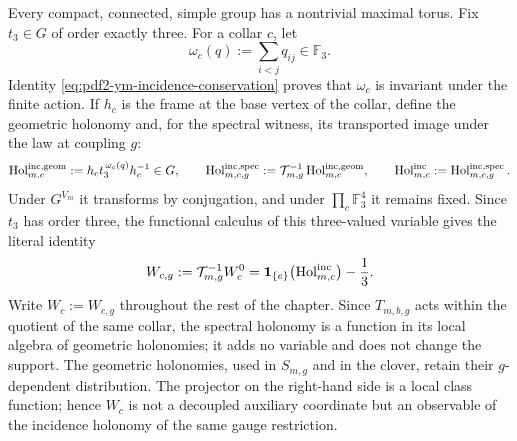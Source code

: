 Every compact, connected, simple group has a nontrivial maximal torus. Fix
$t_3\in G$ of order exactly three. For a collar $c$, let
\begin{equation}\label{eq:pdf2-ym-owner-incidence-flux}
 \omega_c(q):=\sum_{i<j}q_{ij}\in\mathbb F_3.
\end{equation}
Identity \eqref{eq:pdf2-ym-incidence-conservation} proves that $\omega_c$ is
invariant under the finite action. If $h_c$ is the frame at the base vertex of the collar,
define the geometric holonomy and, for the spectral witness, its transported image
under the law at coupling $g$:
\begin{equation}\label{eq:pdf2-ym-owner-incidence-holonomy}
 \operatorname{Hol}_{m,c}^{\rm inc,geom}:=h_ct_3^{\,\omega_c(q)}h_c^{-1}\in G,
 \qquad
 \operatorname{Hol}_{m,c,g}^{\rm inc,spec}
 :=\mathcal T_{m,g}^{-1}\operatorname{Hol}_{m,c}^{\rm inc,geom},
 \qquad
 \operatorname{Hol}_{m,c}^{\rm inc}:=\operatorname{Hol}_{m,c,g}^{\rm inc,spec}.
\end{equation}
Under $G^{V_m}$ it transforms by conjugation, and under
$\prod_c\mathbb F_3^4$ it remains fixed. Since $t_3$ has order three, the functional
calculus of this three-valued variable gives the literal identity
\begin{equation}\label{eq:pdf2-ym-owner-wc-curvature-functional}
 W_{c,g}:=\mathcal T_{m,g}^{-1}W_c^0
 =\mathbf1_{\{e\}}\!\left(\operatorname{Hol}_{m,c}^{\rm inc}\right)-\frac13.
\end{equation}
Write $W_c:=W_{c,g}$ throughout the rest of the chapter.
Since $T_{m,b,g}$ acts within the quotient of the same collar, the spectral holonomy
is a function in its local algebra of geometric holonomies; it adds no variable
and does not change the support. The geometric holonomies, used in $S_{m,g}$ and in the clover,
retain their $g$-dependent distribution.
The projector on the right-hand side is a local class function; hence $W_c$ is not
a decoupled auxiliary coordinate but an observable of the incidence holonomy
of the same gauge restriction.

